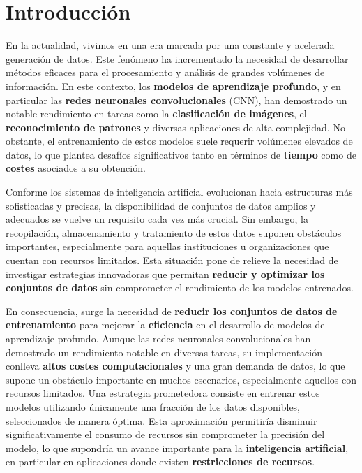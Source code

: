 
\chapter{Introducción}\label{ch:introduccion}

En la actualidad, vivimos en una era marcada por una constante y acelerada generación de datos.
Este fenómeno ha incrementado la necesidad de desarrollar métodos eficaces para el procesamiento y análisis de grandes
volúmenes de información.
En este contexto, los \textbf{modelos de aprendizaje profundo}, y en particular las
\textbf{redes neuronales convolucionales} (CNN), han demostrado un notable rendimiento en tareas como la
\textbf{clasificación de imágenes}, el \textbf{reconocimiento de patrones} y diversas aplicaciones de alta complejidad.
No obstante, el entrenamiento de estos modelos suele requerir volúmenes elevados de datos, lo que plantea desafíos
significativos tanto en términos de \textbf{tiempo} como de \textbf{costes} asociados a su obtención.



Conforme los sistemas de inteligencia artificial evolucionan hacia estructuras más sofisticadas y precisas, la
disponibilidad de conjuntos de datos amplios y adecuados se vuelve un requisito cada vez más crucial.
Sin embargo, la recopilación, almacenamiento y tratamiento de estos datos suponen obstáculos importantes, especialmente
para aquellas instituciones u organizaciones que cuentan con recursos limitados.
Esta situación pone de relieve la necesidad de investigar estrategias innovadoras que permitan
\textbf{reducir y optimizar los conjuntos de datos} sin comprometer el rendimiento de los modelos entrenados.


En consecuencia, surge la necesidad de \textbf{reducir los conjuntos de datos de entrenamiento} 
para mejorar la \textbf{eficiencia} en el desarrollo de modelos de aprendizaje profundo.
Aunque las redes neuronales convolucionales han demostrado un rendimiento notable en diversas tareas, su implementación
conlleva \textbf{altos costes computacionales} y una gran demanda de datos, lo que  supone un obstáculo importante en muchos escenarios,
especialmente aquellos con recursos limitados.
Una estrategia prometedora consiste en entrenar estos modelos utilizando únicamente una fracción de los datos
disponibles, seleccionados de manera óptima.
Esta aproximación permitiría disminuir significativamente el consumo de recursos sin comprometer la precisión del
modelo, lo que supondría un avance importante para la \textbf{inteligencia artificial}, en particular en aplicaciones
donde existen \textbf{restricciones de recursos}.


